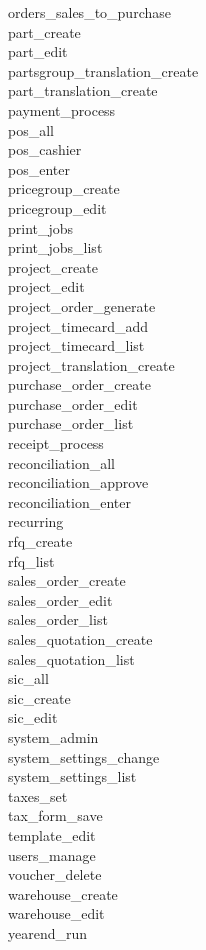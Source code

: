 \begin{description}
\item [orders\_sales\_to\_purchase]
\item [part\_create]
\item [part\_edit]
\item [partsgroup\_translation\_create]
\item [part\_translation\_create]
\item [payment\_process]
\item [pos\_all]
\item [pos\_cashier]
\item [pos\_enter]
\item [pricegroup\_create]
\item [pricegroup\_edit]
\item [print\_jobs]
\item [print\_jobs\_list]
\item [project\_create]
\item [project\_edit]
\item [project\_order\_generate]
\item [project\_timecard\_add]
\item [project\_timecard\_list]
\item [project\_translation\_create]
\item [purchase\_order\_create]
\item [purchase\_order\_edit]
\item [purchase\_order\_list]
\item [receipt\_process]
\item [reconciliation\_all]
\item [reconciliation\_approve]
\item [reconciliation\_enter]
\item [recurring]
\item [rfq\_create]
\item [rfq\_list]
\item [sales\_order\_create]
\item [sales\_order\_edit]
\item [sales\_order\_list]
\item [sales\_quotation\_create]
\item [sales\_quotation\_list]
\item [sic\_all]
\item [sic\_create]
\item [sic\_edit]
\item [system\_admin]
\item [system\_settings\_change]
\item [system\_settings\_list]
\item [taxes\_set]
\item [tax\_form\_save]
\item [template\_edit]
\item [users\_manage]
\item [voucher\_delete]
\item [warehouse\_create]
\item [warehouse\_edit]
\item [yearend\_run]
\end{description}

